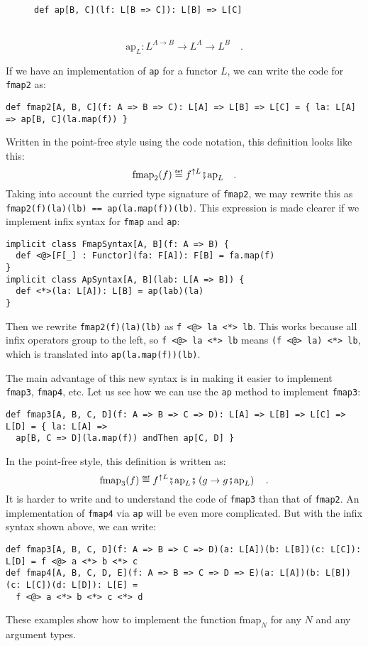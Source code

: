\begin{wrapfigure}{l}{0.543\columnwidth}%
\vspace{-0.6\baselineskip}
\begin{lstlisting}
def ap[B, C](lf: L[B => C]): L[B] => L[C]
\end{lstlisting}

\vspace{-0.5\baselineskip}
\end{wrapfigure}%

~\vspace{-0.5\baselineskip}
\[
\text{ap}_{L}:L^{A\rightarrow B}\rightarrow L^{A}\rightarrow L^{B}\quad.
\]

If we have an implementation of \lstinline!ap! for a functor $L$,
we can write the code for \lstinline!fmap2! as:
\begin{lstlisting}
def fmap2[A, B, C](f: A => B => C): L[A] => L[B] => L[C] = { la: L[A] => ap[B, C](la.map(f)) }
\end{lstlisting}
Written in the point-free style using the code notation, this definition
looks like this:
\[
\text{fmap}_{2}(f)\triangleq f^{\uparrow L}\bef\text{ap}_{L}\quad.
\]
Taking into account the curried type signature of \lstinline!fmap2!,
we may rewrite this as \lstinline!fmap2(f)(la)(lb) == ap(la.map(f))(lb)!.
This expression is made clearer if we implement infix syntax for \lstinline!fmap!
and \lstinline!ap!:
\begin{lstlisting}
implicit class FmapSyntax[A, B](f: A => B) {
  def <@>[F[_] : Functor](fa: F[A]): F[B] = fa.map(f)
} 
implicit class ApSyntax[A, B](lab: L[A => B]) {
  def <*>(la: L[A]): L[B] = ap(lab)(la)
}
\end{lstlisting}
Then we rewrite \lstinline!fmap2(f)(la)(lb)! as \lstinline!f <@> la <*> lb!.
This works because all infix operators group to the left, so \lstinline!f <@> la <*> lb!
means \lstinline!(f <@> la) <*> lb!, which is translated into \lstinline!ap(la.map(f))(lb)!.

The main advantage of this new syntax is in making it easier to implement
\lstinline!fmap3!, \lstinline!fmap4!, etc. Let us see how we can
use the \lstinline!ap! method to implement \lstinline!fmap3!:
\begin{lstlisting}
def fmap3[A, B, C, D](f: A => B => C => D): L[A] => L[B] => L[C] => L[D] = { la: L[A] =>
  ap[B, C => D](la.map(f)) andThen ap[C, D] }
\end{lstlisting}
In the point-free style, this definition is written as:
\[
\text{fmap}_{3}(f)\triangleq f^{\uparrow L}\bef\text{ap}_{L}\bef\left(g\rightarrow g\bef\text{ap}_{L}\right)\quad.
\]
It is harder to write and to understand the code of \lstinline!fmap3!
than that of \lstinline!fmap2!. An implementation of \lstinline!fmap4!
via \lstinline!ap! will be even more complicated. But with the infix
syntax shown above, we can write:
\begin{lstlisting}
def fmap3[A, B, C, D](f: A => B => C => D)(a: L[A])(b: L[B])(c: L[C]): L[D] = f <@> a <*> b <*> c
def fmap4[A, B, C, D, E](f: A => B => C => D => E)(a: L[A])(b: L[B])(c: L[C])(d: L[D]): L[E] =
  f <@> a <*> b <*> c <*> d
\end{lstlisting}
These examples show how to implement the function $\text{fmap}_{N}$
for any $N$ and any argument types.

